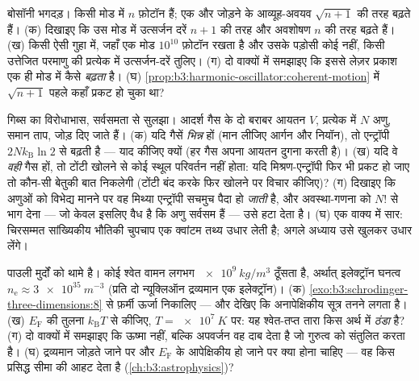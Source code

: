 \begin{exercise}[$\star\star$]\label{exo:b3:identical-particles:9}
बोसॉनी भगदड़। किसी मोड में $n$ फ़ोटॉन हैं; एक और जोड़ने के आव्यूह-अवयव
$\sqrt{n+1}$ की तरह बढ़ते हैं। (क) दिखाइए कि उस मोड में उत्सर्जन दरें
$n + 1$ की तरह और अवशोषण $n$ की तरह बढ़ते हैं। (ख) किसी ऐसी गुहा में,
जहाँ एक मोड $10^{10}$ फ़ोटॉन रखता है और उसके पड़ोसी कोई नहीं, किसी
उत्तेजित परमाणु की प्रत्येक में उत्सर्जन-दरें तुलिए। (ग) दो वाक्यों
में समझाइए कि इससे लेज़र प्रकाश एक ही मोड में कैसे \emph{बढ़ता} है।
(घ) \cref{prop:b3:harmonic-oscillator:coherent-motion} में
$\sqrt{n+1}$ पहले कहाँ प्रकट हो चुका था?
\end{exercise}

\begin{exercise}[$\star\star\star$]\label{exo:b3:identical-particles:10}
गिब्स का विरोधाभास, सर्वसमता से सुलझा। आदर्श गैस के दो बराबर आयतन $V$,
प्रत्येक में $N$ अणु, समान ताप, जोड़ दिए जाते हैं। (क) यदि गैसें
\emph{भिन्न} हों (मान लीजिए आर्गन और नियॉन), तो एन्ट्रॉपी
$2Nk_{\text{B}}\ln2$ से बढ़ती है --- याद कीजिए क्यों (हर गैस अपना
आयतन दुगना करती है)। (ख) यदि वे \emph{वही} गैस हों, तो टोंटी खोलने से
कोई स्थूल परिवर्तन नहीं होता: यदि मिश्रण-एन्ट्रॉपी फिर भी प्रकट हो
जाए तो कौन-सी बेतुकी बात निकलेगी (टोंटी बंद करके फिर खोलने पर विचार
कीजिए)? (ग) दिखाइए कि अणुओं को विभेद्य मानने पर वह मिथ्या एन्ट्रॉपी
सचमुच पैदा हो \emph{जाती} है, और अवस्था-गणना को $N!$ से भाग देना ---
जो केवल इसलिए वैध है कि अणु सर्वसम हैं --- उसे हटा देता है। (घ) एक
वाक्य में सार: चिरसम्मत सांख्यिकीय भौतिकी चुपचाप एक क्वांटम तथ्य उधार
लेती है; अगले अध्याय उसे खुलकर उधार लेंगे।
\end{exercise}

\begin{exercise}[$\star\star\star$]\label{exo:b3:identical-particles:11}
पाउली मुर्दों को थामे है। कोई श्वेत वामन लगभग
$\qty{e9}{kg/m^3}$ ठूँसता है, अर्थात् इलेक्ट्रॉन घनत्व $n_{\text{e}} \approx
\qty{3e35}{m^{-3}}$ (प्रति दो न्यूक्लिऑन द्रव्यमान एक इलेक्ट्रॉन)। (क)
\cref{exo:b3:schrodinger-three-dimensions:8}
से फ़र्मी ऊर्जा निकालिए --- और देखिए कि अनापेक्षिकीय सूत्र तनने लगता
है। (ख) $E_{\text{F}}$ की तुलना $k_{\text{B}}T$ से कीजिए,
$T = \qty{e7}{K}$ पर: यह श्वेत-तप्त तारा किस अर्थ में \emph{ठंडा} है?
(ग) दो वाक्यों में समझाइए कि ऊष्मा नहीं, बल्कि अपवर्जन वह दाब देता है
जो गुरुत्व को संतुलित करता है। (घ) द्रव्यमान जोड़ते जाने पर और
$E_{\text{F}}$ के आपेक्षिकीय हो जाने पर क्या होना चाहिए --- वह किस
प्रसिद्ध सीमा की आहट देता है (\cref{ch:b3:astrophysics})?
\end{exercise}

